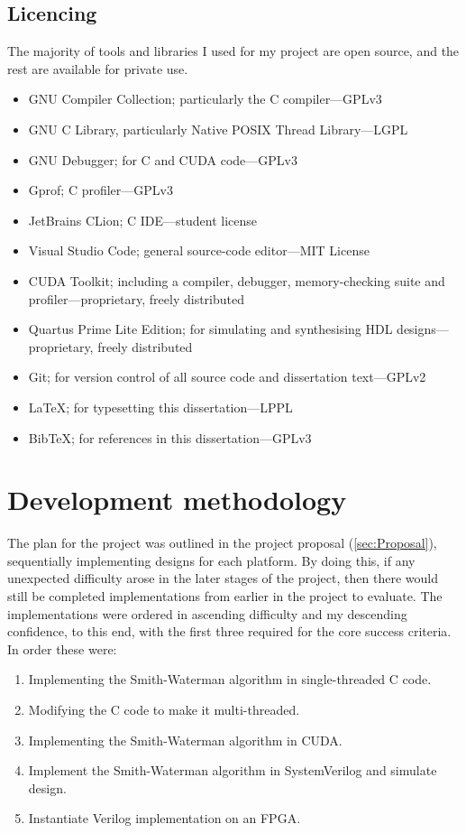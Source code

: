 \FloatBarrier

\subsection{Licencing}
\label{sec:Licencing_prep}

The majority of tools and libraries I used for my project are open source, and the rest are available for private use.
\begin{itemize}
\item GNU Compiler Collection; particularly the C compiler---GPLv3
\item GNU C Library, particularly Native POSIX Thread Library---LGPL
\item GNU Debugger; for C and CUDA code---GPLv3
\item Gprof; C profiler---GPLv3
\item JetBrains CLion; C IDE---student license
\item Visual Studio Code; general source-code editor---MIT License
\item CUDA Toolkit; including a compiler, debugger, memory-checking suite and profiler---proprietary, freely distributed
\item Quartus Prime Lite Edition; for simulating and synthesising HDL designs---proprietary, freely distributed
\item Git; for version control of all source code and dissertation text---GPLv2
\item LaTeX; for typesetting this dissertation---LPPL
\item BibTeX; for references in this dissertation---GPLv3
\end{itemize}

\section{Development methodology}
\label{sec:Methodology_prep}

The plan for the project was outlined in the project proposal (\cref{sec:Proposal}), sequentially implementing designs for each platform.
By doing this, if any unexpected difficulty arose in the later stages of the project, then there would still be completed implementations from earlier in the project to evaluate.
The implementations were ordered in ascending difficulty and my descending confidence, to this end, with the first three required for the core success criteria.
In order these were:
\begin{enumerate}
\item Implementing the Smith-Waterman algorithm in single-threaded C code.
\item Modifying the C code to make it multi-threaded.
\item Implementing the Smith-Waterman algorithm in CUDA.
\item Implement the Smith-Waterman algorithm in SystemVerilog and simulate design.
\item Instantiate Verilog implementation on an FPGA.
\end{enumerate}

